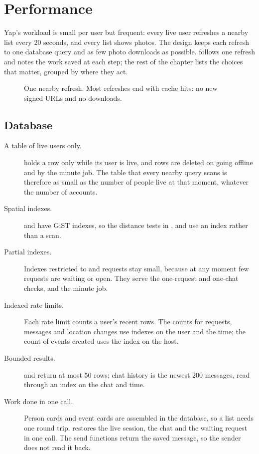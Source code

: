 \chapter{Performance}
\label{ch:performance}

Yap's workload is small per user but frequent: every live user refreshes a nearby list every 20 seconds,
and every list shows photos. The design keeps each refresh to one database query and as few photo
downloads as possible.  follows one refresh and notes the work saved at each step;
the rest of the chapter lists the choices that matter, grouped by where they act.

\begin{figure}[ht]
  \centering
  
  \caption{One nearby refresh. Most refreshes end with cache hits: no new signed URLs and no downloads.}
  \label{fig:nearby-path}
\end{figure}

\section{Database}

\begin{description}
  \item[A table of live users only.]  holds a row only while its user is live, and
    rows are deleted on going offline and by the minute job. The table that every nearby query scans is
    therefore as small as the number of people live at that moment, whatever the number of accounts.
  \item[Spatial indexes.]  and  have GiST indexes, so
    the distance tests in ,  and  use an index rather
    than a scan.
  \item[Partial indexes.] Indexes restricted to  and  requests stay small,
    because at any moment few requests are waiting or open. They serve the one-request and one-chat checks,
     and the minute job.
  \item[Indexed rate limits.] Each rate limit counts a user's recent rows. The counts for requests,
    messages and location changes use indexes on the user and the time; the count of events created uses
    the index on the host.
  \item[Bounded results.]  and  return at most 50 rows; chat history is the
    newest 200 messages, read through an index on the chat and time.
  \item[Work done in one call.] Person cards and event cards are assembled in the database, so a list
    needs one round trip.  restores the live session, the chat and the waiting request in
    one call. The send functions return the saved message, so the sender does not read it back.
\end{description}

